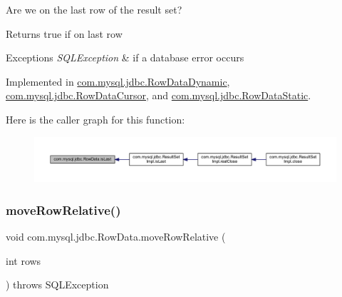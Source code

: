 Are we on the last row of the result set?

\begin{DoxyReturn}{Returns}
true if on last row 
\end{DoxyReturn}

\begin{DoxyExceptions}{Exceptions}
{\em S\+Q\+L\+Exception} & if a database error occurs \\
\hline
\end{DoxyExceptions}


Implemented in \mbox{\hyperlink{classcom_1_1mysql_1_1jdbc_1_1_row_data_dynamic_a40c7f46703795e1c0a508668f82a02fe}{com.\+mysql.\+jdbc.\+Row\+Data\+Dynamic}}, \mbox{\hyperlink{classcom_1_1mysql_1_1jdbc_1_1_row_data_cursor_a33786d1f3d481e4c69912d15a8953675}{com.\+mysql.\+jdbc.\+Row\+Data\+Cursor}}, and \mbox{\hyperlink{classcom_1_1mysql_1_1jdbc_1_1_row_data_static_a2f803e1be38e80c4d1c89cc3a3f32e38}{com.\+mysql.\+jdbc.\+Row\+Data\+Static}}.

Here is the caller graph for this function\+:
\nopagebreak
\begin{figure}[H]
\begin{center}
\leavevmode
\includegraphics[width=350pt]{interfacecom_1_1mysql_1_1jdbc_1_1_row_data_a372c70885e7272deb3ad84fefb75eebb_icgraph}
\end{center}
\end{figure}
\mbox{\label{interfacecom_1_1mysql_1_1jdbc_1_1_row_data_ad0ef1f79fa19fbd533c4e1bfbabd7316}} 
\subsubsection{\texorpdfstring{move\+Row\+Relative()}{moveRowRelative()}}
{\footnotesize\ttfamily void com.\+mysql.\+jdbc.\+Row\+Data.\+move\+Row\+Relative (\begin{DoxyParamCaption}\item[{int}]{rows }\end{DoxyParamCaption}) throws S\+Q\+L\+Exception}

